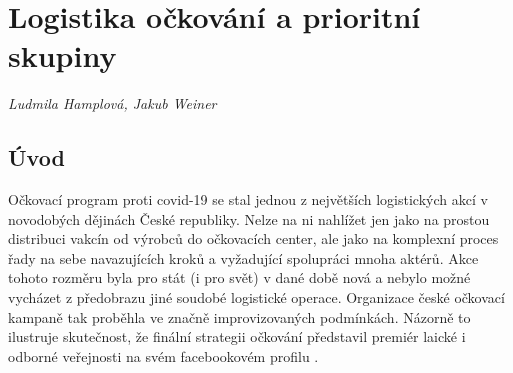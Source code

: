 
\chapter{Logistika očkování a prioritní skupiny}\label{Logistika_ockovani}

\textit{Ludmila Hamplová, Jakub Weiner}
\vspace{15mm}


\section*{Úvod} %
Očkovací program proti covid-19 se stal jednou z největších logistických akcí v novodobých dějinách České republiky. Nelze na ni nahlížet jen jako na prostou distribuci vakcín od výrobců do očkovacích center, ale jako na komplexní proces řady na sebe navazujících kroků a vyžadující spolupráci mnoha aktérů. Akce tohoto rozměru byla pro stát (i pro svět) v dané době nová a nebylo možné vycházet z předobrazu jiné soudobé logistické operace. Organizace české očkovací kampaně tak proběhla ve značně improvizovaných podmínkách. %
Názorně to ilustruje skutečnost, že finální strategii očkování představil premiér laické i odborné veřejnosti na svém facebookovém profilu \cite{logoc_caulidi}. 

